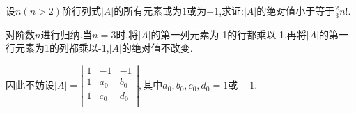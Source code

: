 \documentclass[lang=cn,newtx,10pt,scheme=chinese]{elegantbook}
\begin{document}
\begin{exercise}
    设\(n(n > 2)\)阶行列式\(\vert A \vert\)的所有元素或为\(1\)或为\(-1\),求证:\(\vert A \vert\)的绝对值小于等于\(\frac{2}{3}n!\).
\end{exercise}
\begin{solution}
    对阶数$n$进行归纳.当$n=3$时,将$\left| A \right|$的第一列元素为-1的行都乘以-1,再将$\left| A \right|$的第一行元素为1的列都乘以-1,$\left| A \right|$的绝对值不改变.

    因此不妨设$\left| A \right|=\left| \begin{matrix}
        1&		-1&		-1\\
        1&		a_0&		b_0\\
        1&		c_0&		d_0\\
    \end{matrix} \right|,\text{其中}a_0,b_0,c_0,d_0=1\text{或}-1.$
    

\end{solution}
\end{document}
